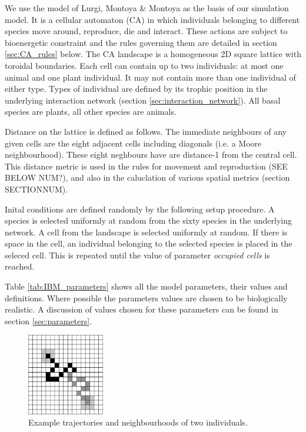 
We use the model of Lurgi, Montoya \& Montoya \cite{lurgi2015effects} as the basis of our simulation model. It is a cellular automaton (CA) in which individuals belonging to different species move around, reproduce, die and interact. These actions are subject to bioenergetic constraint and the rules governing them are detailed in section \ref{sec:CA_rules} below. The CA landscape is a homogeneous 2D square lattice with toroidal boundaries. Each cell can contain up to two individuals: at most one animal and one plant individual. It may not contain more than one individual of either type. Types of individual are defined by its trophic position in the underlying interaction network (section \ref{sec:interaction_network}). All basal species are plants, all other species are animals.

Distance on the lattice is defined as follows. The immediate neighbours of any given cells are the eight adjacent cells including diagonals (i.e. a Moore neighbourhood). These eight neghbours have are distance-1 from the central cell. This distance metric is used in the rules for movement and reproduction (SEE BELOW NUM?), and also in the caluclation of various spatial metrics (section SECTIONNUM).

Inital conditions are defined randomly by the following setup procedure. A species is selected uniformly at random from the sixty species in the underlying network. A cell from the landscape is selected uniformly at random. If there is space in the cell, an individual belonging to the selected species is placed in the seleced cell. This is repeated until the value of parameter \emph{occupied cells} is reached.  

Table \ref{tab:IBM_parameters} shows all the model parameters, their values and definitions. Where possible the parameters values are chosen to be biologically realistic. A discussion of values chosen for these parameters can be found in section \ref{sec:parameters}. 






\begin{figure}
	\centering
	\includegraphics[width=0.3\textwidth]{"diagrams/IBM_movement"}
	\caption{Example trajectories and neighbourhoods of two individuals.}
	\label{fig:IBM_motion}
\end{figure}


